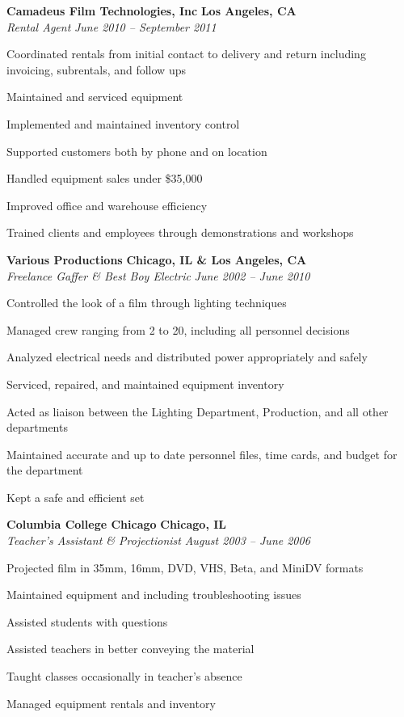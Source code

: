 \documentclass[10pt,letterpaper]{article}			%
\newcommand{\JobHeader}[4]{							%
			\vspace{-.4em}
			\textbf{#1}
			\hfill
			\textbf{#2}
			\\
			\emph{#3}
			\hfill
			\emph{#4}\par
			\vspace{-1em}
			}
\begin{document}
	\JobHeader{Camadeus Film Technologies, Inc}{Los Angeles, CA}{Rental Agent}{June 2010 -- September 2011}
		\begin{itemize*}
		\item Coordinated rentals from initial contact to delivery and return including invoicing, subrentals, and follow ups
		\item Maintained and serviced equipment
		\item Implemented and maintained inventory control
		\item Supported customers both by phone and on location
		\item Handled equipment sales under \$35,000
		\item Improved office and warehouse efficiency
		\item Trained clients and employees through demonstrations and workshops
		\end{itemize*}

	\JobHeader{Various Productions}{Chicago, IL \& Los Angeles, CA}{Freelance Gaffer \& Best Boy Electric}{June 2002 -- June 2010}
		\begin{itemize*}
		\item Controlled the look of a film through lighting techniques 
		\item Managed crew ranging from 2 to 20, including all personnel decisions
		\item Analyzed electrical needs and distributed power appropriately and safely
		\item Serviced, repaired, and maintained equipment inventory
		\item Acted as liaison between the Lighting Department, Production, and all other departments
		\item Maintained accurate and up to date personnel files, time cards, and budget for the department
		\item Kept a safe and efficient set
		\end{itemize*}

	\JobHeader{Columbia College Chicago}{Chicago, IL}{Teacher's Assistant \& Projectionist}{August 2003 -- June 2006}
		\begin{itemize*}
		\item Projected film in 35mm, 16mm, DVD, VHS, Beta, and MiniDV formats 
		\item Maintained equipment and including troubleshooting issues 
		\item Assisted students with questions 
		\item Assisted teachers in better conveying the material 
		\item Taught classes occasionally in teacher's absence
		\item Managed equipment rentals and inventory
		\end{itemize*}
		
\end{document}

